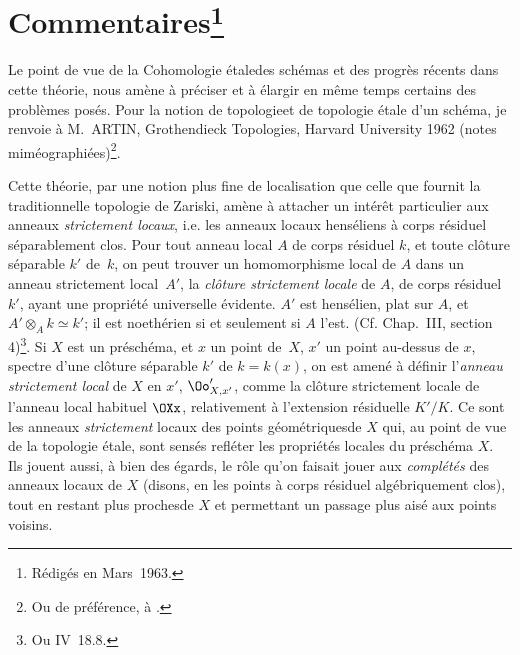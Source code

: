 \section[Commentaires]{Commentaires\footnote{R\'edig\'es en Mars~1963.}} \label{XIII.6}

Le point de vue de la \og Cohomologie \'etale\fg des sch\'emas et des progr\`es r\'ecents dans cette th\'eorie, nous am\`ene \`a pr\'eciser et \`a \'elargir en m\^eme temps certains des probl\`emes pos\'es. Pour la notion de \og topologie\fg et de \og topologie \'etale d'un sch\'ema\fg, je renvoie \`a M.\, ARTIN, Grothendieck Topologies, Harvard University 1962 (notes mim\'eographi\'ees)\footnote{Ou de pr\'ef\'erence, \`a .}.

Cette th\'eorie, par une notion plus fine de localisation que celle que fournit la traditionnelle \og topologie de Zariski\fg, am\`ene \`a attacher un int\'er\^et particulier aux anneaux \emph{strictement locaux}\label{pXIII.6}, i.e. les anneaux locaux hens\'eliens \`a corps r\'esiduel s\'eparablement clos. Pour tout anneau local $A$ de corps r\'esiduel $k$, et toute cl\^{o}ture s\'eparable $k'$ de~$k$, on peut trouver un homomorphisme local de $A$ dans un anneau strictement local~$A'$, la \emph{clôture strictement locale} de $A$, de corps r\'esiduel $k'$, ayant une propri\'et\'e universelle \'evidente. $A'$ est hens\'elien, plat sur $A$, et $A'\otimes_A k\simeq k'$; il est noeth\'erien si et seulement si $A$ l'est. (Cf. \loccit Chap.\, III, section 4)\footnote{Ou \EGA IV~18.8.}. Si $X$ est un pr\'esch\'ema, et $x$ un point de~$X$, $x'$ un point au-dessus de $x$, spectre d'une cl\^{o}ture s\'eparable $k'$ de $k=k(x)$, on est amen\'e \`a d\'efinir l'\emph{anneau strictement local} de $X$ en $x'$, $\Oo'_{X, x'}$, comme la cl\^{o}ture strictement locale de l'anneau local habituel $\OXx$, relativement \`a l'extension r\'esiduelle $K'/K$. Ce sont les anneaux \emph{strictement} locaux des points \og g\'eom\'etriques\fg de $X$ qui, au point de vue de la topologie \'etale, sont sens\'es refl\'eter les propri\'et\'es locales du pr\'esch\'ema $X$. Ils jouent aussi, \`a bien des \'egards, le r\^{o}le qu'on faisait jouer aux \emph{complétés} des anneaux locaux de $X$ (disons, en les points \`a corps r\'esiduel alg\'ebriquement clos), tout en restant \og plus proches\fg de $X$ et permettant un passage plus ais\'e aux \og points voisins\fg.


